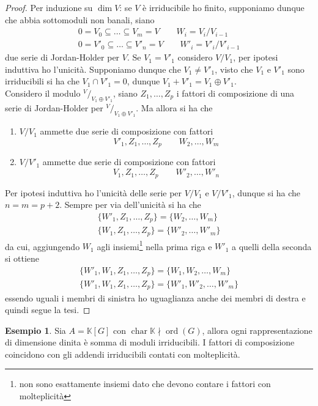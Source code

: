 \documentclass[11pt]{article}
\theoremstyle{plain}
\theoremstyle{definition}
\newtheorem{exmp}{Esempio}[section]
\theoremstyle{remark}
\newcommand{\K}{\mathbb{K}}
\newcommand*\quot[2]{{^{\textstyle #1}\big/_{\textstyle #2}}}
\DeclareMathOperator{\Char}{char}
\DeclareMathOperator{\ord}{ord}
\begin{document}
	\begin{proof}
		Per induzione su $\dim V$: se $V$ è irriducibile ho finito, supponiamo dunque che abbia sottomoduli non banali, siano
		\begin{gather*}
			0=V_0\subseteq\ldots \subseteq V_m = V\qquad W_i=V_i/V_{i-1}\\
			0=V'_0\subseteq\ldots \subseteq V'_n = V\qquad W'_i=V'_i/V'_{i-1}
		\end{gather*}
		due serie di Jordan-Holder per $V$. Se $V_1=V'_1$ considero $V/V_1$, per ipotesi induttiva ho l'unicità. Supponiamo dunque che $V_1\neq V'_1$, visto che $V_1$ e $V'_1$ sono irriducibili si ha che $V_1\cap V'_1=0$, dunque $V_1+V'_1=V_1\oplus V'_1$.\\
		Considero il modulo $\quot{V}{V_1\oplus V'_1}$, siano $Z_1,\ldots,Z_p$ i fattori di composizione di una serie di Jordan-Holder per $\quot{V}{V_1\oplus V'_1}$. Ma allora si ha che
		\begin{enumerate}
			\item $V/V_1$ ammette due serie di composizione con fattori
			\[
				V'_1,Z_1,\ldots,Z_p\qquad W_2,\ldots,W_m
			\]
			\item $V/V'_1$ ammette due serie di composizione con fattori
			\[
				V_1,Z_1,\ldots,Z_p\qquad W'_2,\ldots,W'_n
			\]
		\end{enumerate}
		Per ipotesi induttiva ho l'unicità delle serie per $V/V_1$ e $V/V'_1$, dunque si ha che $n=m=p+2$. Sempre per via dell'unicità si ha che
		\begin{gather*}
			\{ W'_1,Z_1,\ldots,Z_p\} = \{ W_2,\ldots,W_m\}\\
			\{ W_1,Z_1,\ldots,Z_p\} = \{ W'_2,\ldots,W'_m\}
		\end{gather*}
		da cui, aggiungendo $W_1$ agli insiemi\footnote{non sono esattamente insiemi dato che devono contare i fattori con molteplicità} nella prima riga e $W'_1$ a quelli della seconda si ottiene
		\begin{gather*}
			\{ W'_1,W_1,Z_1,\ldots,Z_p\} = \{ W_1,W_2,\ldots,W_m\}\\
			\{ W'_1,W_1,Z_1,\ldots,Z_p\} = \{ W'_1,W'_2,\ldots,W'_m\}
		\end{gather*}
		essendo uguali i membri di sinistra ho uguaglianza anche dei membri di destra e quindi segue la tesi.
	\end{proof}
	\begin{exmp}
		Sia $A=\K[G]$ con $\Char \K \nmid \ord(G)$, allora ogni rappresentazione di dimensione dinita è somma di moduli irriducibili. I fattori di composizione coincidono con gli addendi irriducibili contati con molteplicità.
	\end{exmp}
\end{document}
